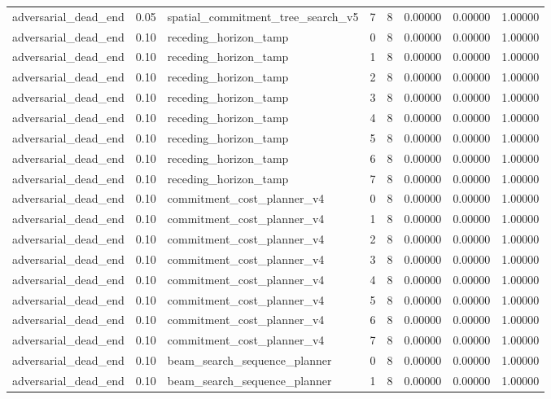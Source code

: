 \documentclass{article}
\begin{document}
\begin{table}[tbp]
{\begin{tabular}{llllllll}
adversarial\_dead\_end & 0.05 & spatial\_commitment\_tree\_search\_v5 & 7 & 8 & 0.00000 & 0.00000 & 1.00000 \\
adversarial\_dead\_end & 0.10 & receding\_horizon\_tamp & 0 & 8 & 0.00000 & 0.00000 & 1.00000 \\
adversarial\_dead\_end & 0.10 & receding\_horizon\_tamp & 1 & 8 & 0.00000 & 0.00000 & 1.00000 \\
adversarial\_dead\_end & 0.10 & receding\_horizon\_tamp & 2 & 8 & 0.00000 & 0.00000 & 1.00000 \\
adversarial\_dead\_end & 0.10 & receding\_horizon\_tamp & 3 & 8 & 0.00000 & 0.00000 & 1.00000 \\
adversarial\_dead\_end & 0.10 & receding\_horizon\_tamp & 4 & 8 & 0.00000 & 0.00000 & 1.00000 \\
adversarial\_dead\_end & 0.10 & receding\_horizon\_tamp & 5 & 8 & 0.00000 & 0.00000 & 1.00000 \\
adversarial\_dead\_end & 0.10 & receding\_horizon\_tamp & 6 & 8 & 0.00000 & 0.00000 & 1.00000 \\
adversarial\_dead\_end & 0.10 & receding\_horizon\_tamp & 7 & 8 & 0.00000 & 0.00000 & 1.00000 \\
adversarial\_dead\_end & 0.10 & commitment\_cost\_planner\_v4 & 0 & 8 & 0.00000 & 0.00000 & 1.00000 \\
adversarial\_dead\_end & 0.10 & commitment\_cost\_planner\_v4 & 1 & 8 & 0.00000 & 0.00000 & 1.00000 \\
adversarial\_dead\_end & 0.10 & commitment\_cost\_planner\_v4 & 2 & 8 & 0.00000 & 0.00000 & 1.00000 \\
adversarial\_dead\_end & 0.10 & commitment\_cost\_planner\_v4 & 3 & 8 & 0.00000 & 0.00000 & 1.00000 \\
adversarial\_dead\_end & 0.10 & commitment\_cost\_planner\_v4 & 4 & 8 & 0.00000 & 0.00000 & 1.00000 \\
adversarial\_dead\_end & 0.10 & commitment\_cost\_planner\_v4 & 5 & 8 & 0.00000 & 0.00000 & 1.00000 \\
adversarial\_dead\_end & 0.10 & commitment\_cost\_planner\_v4 & 6 & 8 & 0.00000 & 0.00000 & 1.00000 \\
adversarial\_dead\_end & 0.10 & commitment\_cost\_planner\_v4 & 7 & 8 & 0.00000 & 0.00000 & 1.00000 \\
adversarial\_dead\_end & 0.10 & beam\_search\_sequence\_planner & 0 & 8 & 0.00000 & 0.00000 & 1.00000 \\
adversarial\_dead\_end & 0.10 & beam\_search\_sequence\_planner & 1 & 8 & 0.00000 & 0.00000 & 1.00000 \\
\bottomrule
\end{tabular}
}
\end{table}
\end{document}
